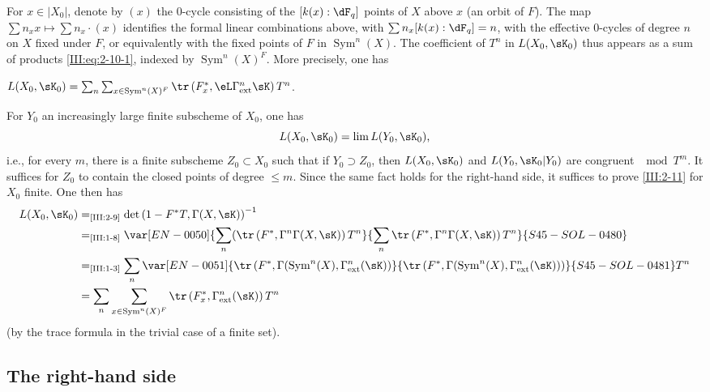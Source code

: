 For $x\in |X_0|$, denote by $(x)$ the $0$-cycle consisting of the
$[k(x):\dF_q]$ points of $X$ above $x$ (an orbit of $F$). The map
$\sum n_x x\mapsto \sum n_x\cdot (x)$ identifies the formal linear combinations
above, with $\sum n_x [k(x):\dF_q]=n$, with the effective $0$-cycles of degree
$n$ on $X$ fixed under $F$, or equivalently with the fixed points of $F$ in
$\operatorname{Sym}^n(X)$. The coefficient of $T^n$ in $L(X_0,\sK_0)$ thus
appears as a sum of products \eqref{III:eq:2-10-1}, indexed by
$\operatorname{Sym}^n(X)^F$. More precisely, one has





\begin{lemma_}\label{III:2-11}
 $L(X_0,\sK_0) = \sum_n \sum_{x\in\operatorname{Sym}^n(X)^F} \tr\left(F_x^*,\eL\Gamma_\textnormal{ext}^n \sK\right) T^n$.
\end{lemma_}

For $Y_0$ an increasingly large finite subscheme of $X_0$, one has
\[
  L(X_0,\sK_0) = \lim L(Y_0,\sK_0) \text{,}
\]
i.e., for every $m$, there is a finite subscheme $Z_0\subset X_0$ such that
if $Y_0\supset Z_0$, then $L(X_0,\sK_0)$ and $L(Y_0,\sK_0|Y_0)$ are congruent
$\mod T^m$.
It suffices for $Z_0$ to contain the closed points of degree $\leqslant m$.
Since the same fact holds for the right-hand side, it suffices to prove
\ref{III:2-11} for $X_0$ finite. One then has
\begin{align*}
  L(X_0,\sK_0)
    &=_\text{\ref{III:2-9}} \det\left(1-F^* T,\Gamma(X,\sK)\right)^{-1} \\
    &=_\text{\ref{III:1-8}} \var[EN-0050]{\sum_n (\tr\left(F^*,\Gamma^n \Gamma(X,\sK)\right) T^n}{\sum_n \tr\left(F^*,\Gamma^n \Gamma(X,\sK)\right) T^n}{S45-SOL-0480} \\
    &=_\text{\ref{III:1-3}} \sum_n \var[EN-0051]{\tr\left(F^*,\Gamma(\operatorname{Sym}^n(X),\Gamma_\text{ext}^n(\sK)\right)}{\tr\left(F^*,\Gamma(\operatorname{Sym}^n(X),\Gamma_\text{ext}^n(\sK))\right)}{S45-SOL-0481} T^n \\
    &= \sum_n \sum_{x\in \operatorname{Sym}^n(X)^F} \tr\left(F_x^*,\Gamma_\text{ext}^n(\sK)\right) T^n
\end{align*}
(by the trace formula in the trivial case of a finite set).






\subsection{The right-hand side}\label{III:2-12}

